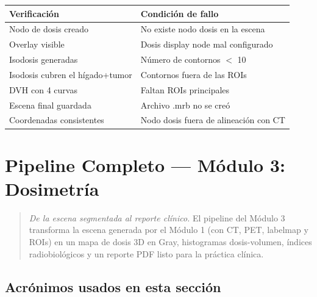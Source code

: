 \documentclass[12pt,a4paper]{article}
\begin{document}
\begin{tabular}{p{5cm} p{10cm}}
\toprule
\textbf{Verificación} & \textbf{Condición de fallo} \\
\midrule
Nodo de dosis creado & No existe nodo dosis en la escena \\
Overlay visible & Dosis display node mal configurado \\
Isodosis generadas & Número de contornos $<$ 10 \\
Isodosis cubren el hígado+tumor & Contornos fuera de las ROIs \\
DVH con 4 curvas & Faltan ROIs principales \\
Escena final guardada & Archivo .mrb no se creó \\
Coordenadas consistentes & Nodo dosis fuera de alineación con CT \\
\bottomrule
\end{tabular}

\newpage

\section{Pipeline Completo --- Módulo 3: Dosimetría}

\begin{quote}
\textit{De la escena segmentada al reporte clínico.} El pipeline del Módulo 3 transforma la escena generada por el Módulo 1 (con CT, PET, labelmap y ROIs) en un mapa de dosis 3D en Gray, histogramas dosis-volumen, índices radiobiológicos y un reporte PDF listo para la práctica clínica.
\end{quote}

\subsection*{Acrónimos usados en esta sección}
\end{document}
